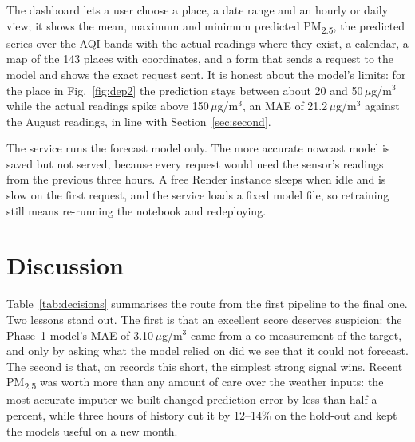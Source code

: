 \documentclass{ieeeaccess}
\newcommand{\ugm}{\,$\mu$g/m$^{3}$}
\newcommand{\pmtwo}{PM\textsubscript{2.5}}
\begin{document}
The dashboard lets a user choose a place, a date range and an hourly or daily view; it shows the mean, maximum and minimum predicted \pmtwo{}, the predicted series over the AQI bands with the actual readings where they exist, a calendar, a map of the 143 places with coordinates, and a form that sends a request to the model and shows the exact request sent. It is honest about the model's limits: for the place in Fig.~\ref{fig:dep2} the prediction stays between about 20 and 50\ugm{} while the actual readings spike above 150\ugm{}, an MAE of 21.2\ugm{} against the August readings, in line with Section~\ref{sec:second}.

The service runs the forecast model only. The more accurate nowcast model is saved but not served, because every request would need the sensor's readings from the previous three hours. A free Render instance sleeps when idle and is slow on the first request, and the service loads a fixed model file, so retraining still means re-running the notebook and redeploying.

\section{Discussion}
\label{sec:discussion}

Table~\ref{tab:decisions} summarises the route from the first pipeline to the final one. Two lessons stand out. The first is that an excellent score deserves suspicion: the Phase~1 model's MAE of 3.10\ugm{} came from a co-measurement of the target, and only by asking what the model relied on did we see that it could not forecast. The second is that, on records this short, the simplest strong signal wins. Recent \pmtwo{} was worth more than any amount of care over the weather inputs: the most accurate imputer we built changed prediction error by less than half a percent, while three hours of history cut it by 12--14\% on the hold-out and kept the models useful on a new month.
\end{document}
